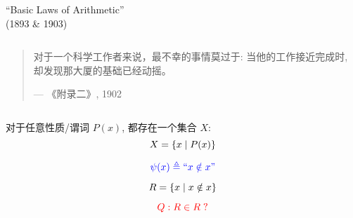 
\begin{frame}{}
  \begin{columns}
      \begin{center}
        {``Basic Laws of Arithmetic'' \\ (1893 \& 1903)}
      \end{center}
  \end{columns}

  \pause
  \vspace{0.80cm}
  \begin{quote}
    对于一个科学工作者来说，最不幸的事情莫过于:
    当他的工作接近完成时, 却发现那大厦的基础已经动摇。

    \hfill --- 《附录二》, 1902
  \end{quote}
\end{frame}


\begin{frame}{}

  \begin{columns}
    \pause
    \pause
    \pause
  \end{columns}
\end{frame}

\begin{frame}{}
  \begin{theorem}[概括原则]
    对于任意性质/谓词 $P(x)$, 都存在一个集合 $X$:
    \[
      X = \{x \mid P(x)\}
    \]
  \end{theorem}

  \pause
  \begin{definition}
    \[
      \textcolor{blue}{\psi(x) \triangleq ``x \notin x"}
    \]

    \pause
    \[
      R = \{x \mid x \notin x\}
    \]

    \pause
    \[
      \textcolor{red}{Q: R \in R\;?}
    \]
  \end{definition}
\end{frame}

